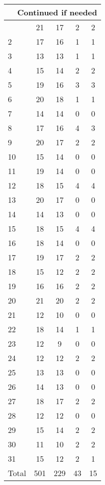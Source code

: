 \begin{center}
\begin{longtable}{l|c|c|c|c}
\hline \multicolumn{5}{|r|}{{Continued if needed}} \\ \hline
\endfoot 
1 & 21 & 17 & 2 & 2\\ \hline
2 & 17 & 16 & 1 & 1\\ \hline
3 & 13 & 13 & 1 & 1\\ \hline
4 & 15 & 14 & 2 & 2\\ \hline
5 & 19 & 16 & 3 & 3\\ \hline
6 & 20 & 18 & 1 & 1\\ \hline
7 & 14 & 14 & 0 & 0\\ \hline
8 & 17 & 16 & 4 & 3\\ \hline
9 & 20 & 17 & 2 & 2\\ \hline
10 & 15 & 14 & 0 & 0\\ \hline
11 & 19 & 14 & 0 & 0\\ \hline
12 & 18 & 15 & 4 & 4\\ \hline
13 & 20 & 17 & 0 & 0\\ \hline
14 & 14 & 13 & 0 & 0\\ \hline
15 & 18 & 15 & 4 & 4\\ \hline
16 & 18 & 14 & 0 & 0\\ \hline
17 & 19 & 17 & 2 & 2\\ \hline
18 & 15 & 12 & 2 & 2\\ \hline
19 & 16 & 16 & 2 & 2\\ \hline
20 & 21 & 20 & 2 & 2\\ \hline
21 & 12 & 10 & 0 & 0\\ \hline
22 & 18 & 14 & 1 & 1\\ \hline
23 & 12 & 9 & 0 & 0\\ \hline
24 & 12 & 12 & 2 & 2\\ \hline
25 & 13 & 13 & 0 & 0\\ \hline
26 & 14 & 13 & 0 & 0\\ \hline
27 & 18 & 17 & 2 & 2\\ \hline
28 & 12 & 12 & 0 & 0\\ \hline
29 & 15 & 14 & 2 & 2\\ \hline
30 & 11 & 10 & 2 & 2\\ \hline
31 & 15 & 12 & 2 & 1\\ \hline
\hline \hline
Total & 501 & 229 & 43 & 15




\end{longtable}
\end{center}



